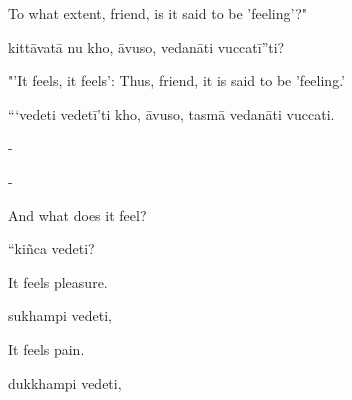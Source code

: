 \begin{samepage}
\begin{leftcolumn*}
To what extent, friend, is it said to be 'feeling'?"
\end{leftcolumn*}

\begin{rightcolumn}
kittāvatā nu kho, āvuso, vedanāti vuccatī”ti?
\end{rightcolumn}
\end{samepage}

\begin{samepage}
\begin{leftcolumn*}
"'It feels, it feels': Thus, friend, it is said to be 'feeling.'
\end{leftcolumn*}

\begin{rightcolumn}
“‘vedeti vedetī’ti kho, āvuso, tasmā vedanāti vuccati.
\end{rightcolumn}
\end{samepage}

\begin{samepage}
\begin{leftcolumn*}
-
\end{leftcolumn*}

\begin{rightcolumn}
-
\end{rightcolumn}
\end{samepage}

\begin{samepage}
\begin{leftcolumn*}
And what does it feel?
\end{leftcolumn*}

\begin{rightcolumn}
“kiñca vedeti?
\end{rightcolumn}
\end{samepage}

\begin{samepage}
\begin{leftcolumn*}
It feels pleasure.
\end{leftcolumn*}

\begin{rightcolumn}
sukhampi vedeti,
\end{rightcolumn}
\end{samepage}

\begin{samepage}
\begin{leftcolumn*}
It feels pain.
\end{leftcolumn*}

\begin{rightcolumn}
dukkhampi vedeti,
\end{rightcolumn}
\end{samepage}

